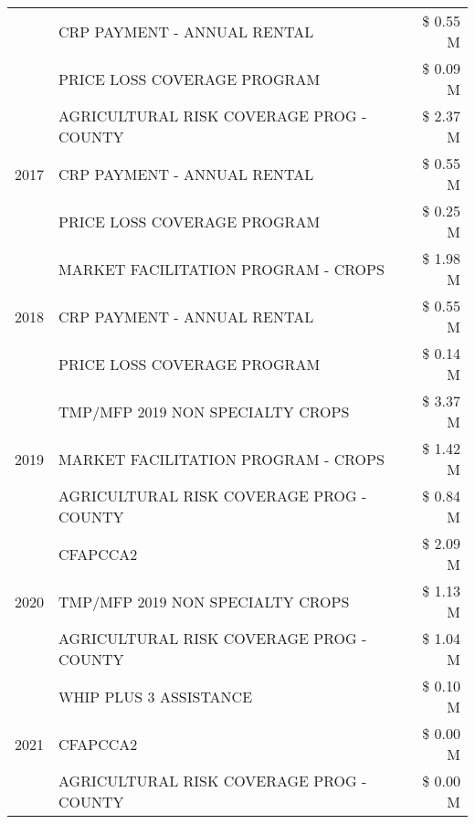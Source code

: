 \begin{tabular}{llr}
 & CRP PAYMENT - ANNUAL RENTAL                   & \$ 0.55 M \\
 & PRICE LOSS COVERAGE PROGRAM                   & \$ 0.09 M \\
\cline{1-3}
\multirow[t]{3}{*}{2017} & AGRICULTURAL RISK COVERAGE PROG - COUNTY & \$ 2.37 M \\
 & CRP PAYMENT - ANNUAL RENTAL & \$ 0.55 M \\
 & PRICE LOSS COVERAGE PROGRAM & \$ 0.25 M \\
\cline{1-3}
\multirow[t]{3}{*}{2018} & MARKET FACILITATION PROGRAM - CROPS & \$ 1.98 M \\
 & CRP PAYMENT - ANNUAL RENTAL & \$ 0.55 M \\
 & PRICE LOSS COVERAGE PROGRAM & \$ 0.14 M \\
\cline{1-3}
\multirow[t]{3}{*}{2019} & TMP/MFP 2019 NON SPECIALTY CROPS & \$ 3.37 M \\
 & MARKET FACILITATION PROGRAM - CROPS & \$ 1.42 M \\
 & AGRICULTURAL RISK COVERAGE PROG - COUNTY & \$ 0.84 M \\
\cline{1-3}
\multirow[t]{3}{*}{2020} & CFAPCCA2 & \$ 2.09 M \\
 & TMP/MFP 2019 NON SPECIALTY CROPS & \$ 1.13 M \\
 & AGRICULTURAL RISK COVERAGE PROG - COUNTY & \$ 1.04 M \\
\cline{1-3}
\multirow[t]{3}{*}{2021} & WHIP PLUS 3 ASSISTANCE & \$ 0.10 M \\
 & CFAPCCA2 & \$ 0.00 M \\
 & AGRICULTURAL RISK COVERAGE PROG - COUNTY & \$ 0.00 M \\
\cline{1-3}
\bottomrule
\end{tabular}
